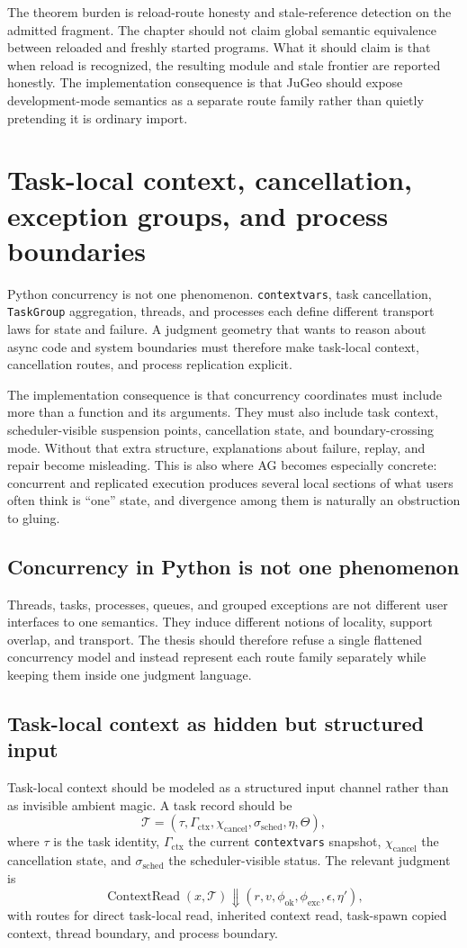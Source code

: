 \documentclass[11pt]{report}
\begin{document}
The theorem burden is reload-route honesty and stale-reference detection on the admitted fragment. The chapter should not claim global semantic equivalence between reloaded and freshly started programs. What it should claim is that when reload is recognized, the resulting module and stale frontier are reported honestly. The implementation consequence is that JuGeo should expose development-mode semantics as a separate route family rather than quietly pretending it is ordinary import.
\chapter{Task-local context, cancellation, exception groups, and process boundaries}
Python concurrency is not one phenomenon. \texttt{contextvars}, task cancellation, \texttt{TaskGroup} aggregation, threads, and processes each define different transport laws for state and failure. A judgment geometry that wants to reason about async code and system boundaries must therefore make task-local context, cancellation routes, and process replication explicit.

The implementation consequence is that concurrency coordinates must include more than a function and its arguments. They must also include task context, scheduler-visible suspension points, cancellation state, and boundary-crossing mode. Without that extra structure, explanations about failure, replay, and repair become misleading. This is also where AG becomes especially concrete: concurrent and replicated execution produces several local sections of what users often think is ``one'' state, and divergence among them is naturally an obstruction to gluing.
\section{Concurrency in Python is not one phenomenon}
Threads, tasks, processes, queues, and grouped exceptions are not different user interfaces to one semantics. They induce different notions of locality, support overlap, and transport. The thesis should therefore refuse a single flattened concurrency model and instead represent each route family separately while keeping them inside one judgment language.
\section{Task-local context as hidden but structured input}
Task-local context should be modeled as a structured input channel rather than as invisible ambient magic. A task record should be
\[
\mathcal{T} = (\tau,\Gamma_{\mathrm{ctx}},\chi_{\mathrm{cancel}},\sigma_{\mathrm{sched}},\eta,\Theta),
\]
where $\tau$ is the task identity, $\Gamma_{\mathrm{ctx}}$ the current \texttt{contextvars} snapshot, $\chi_{\mathrm{cancel}}$ the cancellation state, and $\sigma_{\mathrm{sched}}$ the scheduler-visible status. The relevant judgment is
\[
\operatorname{ContextRead}(x,\mathcal{T}) \Downarrow (r,v,\phi_{\mathrm{ok}},\phi_{\mathrm{exc}},\epsilon,\eta'),
\]
with routes for direct task-local read, inherited context read, task-spawn copied context, thread boundary, and process boundary.
\end{document}
